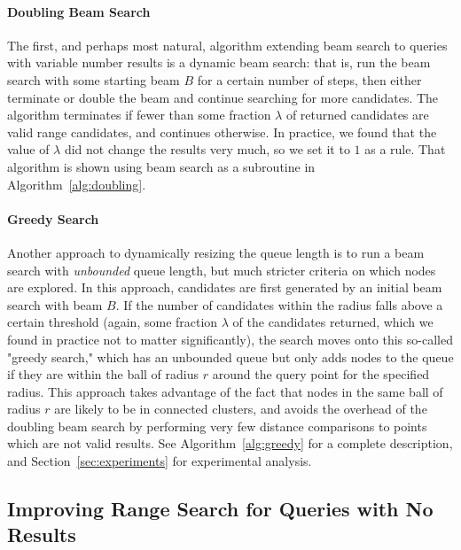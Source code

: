 \paragraph{Doubling Beam Search} The first, and perhaps most natural, algorithm extending beam search to queries with variable number results is a dynamic beam search: that is, run the beam search with some starting beam $B$ for a certain number of steps, then either terminate or double the beam and continue searching for more candidates. The algorithm terminates if fewer than some fraction $\lambda$ of returned candidates are valid range candidates, and continues otherwise. In practice, we found that the value of $\lambda$ did not change the results very much, so we set it to $1$ as a rule. That algorithm is shown using beam search as a subroutine in Algorithm~\ref{alg:doubling}. 


\paragraph{Greedy Search} Another approach to dynamically resizing the queue length is to run a beam search with \textit{unbounded} queue length, but much stricter criteria on which nodes are explored. In this approach, candidates are first generated by an initial beam search with beam $B$. If the number of candidates within the radius falls above a certain threshold (again, some fraction $\lambda$ of the candidates returned, which we found in practice not to matter significantly), the search moves onto this so-called "greedy search," which has an unbounded queue but only adds nodes to the queue if they are within the ball of radius $r$ around the query point for the specified radius. This approach takes advantage of the fact that nodes in the same ball of radius $r$ are likely to be in connected clusters, and avoids the overhead of the doubling beam search by performing very few distance comparisons to points which are not valid results. See Algorithm~\ref{alg:greedy} for a complete description, and Section~\ref{sec:experiments} for experimental analysis.

\subsection{Improving Range Search for Queries with No Results}

